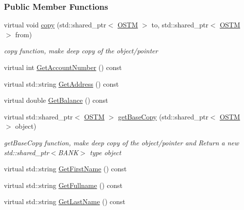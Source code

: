 \subsubsection*{Public Member Functions}
\begin{DoxyCompactItemize}
\item 
virtual void \hyperlink{class_s_w_b_p_l_c_a9468640482a6cfb9bfb4115fc59191d5_a9468640482a6cfb9bfb4115fc59191d5}{copy} (std\+::shared\+\_\+ptr$<$ \hyperlink{class_o_s_t_m}{O\+S\+TM} $>$ to, std\+::shared\+\_\+ptr$<$ \hyperlink{class_o_s_t_m}{O\+S\+TM} $>$ from)
\begin{DoxyCompactList}\small\item\em copy function, make deep copy of the object/pointer \end{DoxyCompactList}\item 
virtual int \hyperlink{class_s_w_b_p_l_c_a1a997f6d333e5021970e50605431d7df_a1a997f6d333e5021970e50605431d7df}{Get\+Account\+Number} () const 
\item 
virtual std\+::string \hyperlink{class_s_w_b_p_l_c_a3a62a57b3ecdd06ed977ef372dab89ad_a3a62a57b3ecdd06ed977ef372dab89ad}{Get\+Address} () const 
\item 
virtual double \hyperlink{class_s_w_b_p_l_c_af7f5f662ab926bfb9c0c1c7156cde24c_af7f5f662ab926bfb9c0c1c7156cde24c}{Get\+Balance} () const 
\item 
virtual std\+::shared\+\_\+ptr$<$ \hyperlink{class_o_s_t_m}{O\+S\+TM} $>$ \hyperlink{class_s_w_b_p_l_c_a77f0e0d6c08a95066d277bf6b2073a5c_a77f0e0d6c08a95066d277bf6b2073a5c}{get\+Base\+Copy} (std\+::shared\+\_\+ptr$<$ \hyperlink{class_o_s_t_m}{O\+S\+TM} $>$ object)
\begin{DoxyCompactList}\small\item\em get\+Base\+Copy function, make deep copy of the object/pointer and Return a new std\+::shared\+\_\+ptr$<$\+B\+A\+N\+K$>$ type object \end{DoxyCompactList}\item 
virtual std\+::string \hyperlink{class_s_w_b_p_l_c_ace6bbcd6546896e581e3a2ee9504d090_ace6bbcd6546896e581e3a2ee9504d090}{Get\+First\+Name} () const 
\item 
virtual std\+::string \hyperlink{class_s_w_b_p_l_c_adb74b3cbc40a401bf7ca4dfb5269c336_adb74b3cbc40a401bf7ca4dfb5269c336}{Get\+Fullname} () const 
\item 
virtual std\+::string \hyperlink{class_s_w_b_p_l_c_a72b2595acea28dae9e4f5816dd3c4652_a72b2595acea28dae9e4f5816dd3c4652}{Get\+Last\+Name} () const 
\item 

\end{DoxyCompactItemize}

